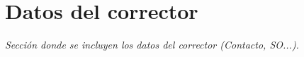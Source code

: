 \section*{Datos del corrector}

\textit{Sección donde se incluyen los datos del corrector (Contacto, SO...).}
